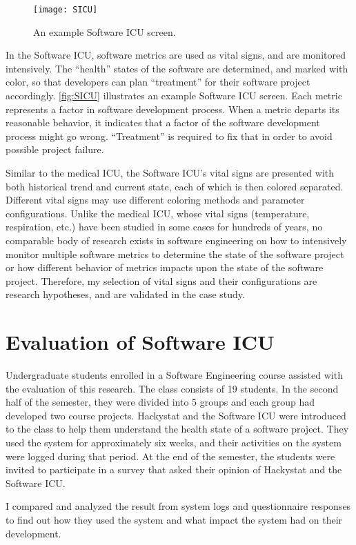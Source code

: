 \begin{figure}[htbp]
   \centering
   \texttt{[image: SICU]}
   \caption{An example Software ICU screen.}
   \label{fig:SICU}
\end{figure}


In the Software ICU, software metrics are used as vital signs, and are monitored intensively. The ``health'' states of the software are determined, and marked with color, so that developers can plan ``treatment'' for their software project accordingly. \autoref{fig:SICU} illustrates an example Software ICU screen. Each metric represents a factor in software development process. When a metric departs its reasonable behavior, it indicates that a factor of the software development process might go wrong. ``Treatment'' is required to fix that in order to avoid possible project failure.
 
Similar to the medical ICU, the Software ICU's vital signs are presented with both historical trend and current state, each of which is then colored separated. Different vital signs may use different coloring methods and parameter configurations. Unlike the medical ICU, whose vital signs (temperature, respiration, etc.) have been studied in some cases for hundreds of years, no comparable body of research exists in software engineering on how to intensively monitor multiple software metrics to determine the state of the software project or how different behavior of metrics impacts upon the state of the software project. Therefore, my selection of vital signs and their configurations are research hypotheses, and are validated in the case study.

\section{Evaluation of Software ICU}
Undergraduate students enrolled in a Software Engineering course assisted with the evaluation of this research. The class consists of 19 students. In the second half of the semester, they were divided into 5 groups and each group had developed two course projects. Hackystat and the Software ICU were introduced to the class to help them understand the health state of a software project. They used the system for approximately six weeks, and their activities on the system were logged during that period. At the end of the semester, the students were invited to participate in a survey that asked their opinion of Hackystat and the Software ICU.

I compared and analyzed the result from system logs and questionnaire responses to find out how they used the system and what impact the system had on their development.

